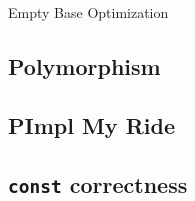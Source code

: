 \begin{frame}{Empty Base Optimization}{}
  \begin{example}
  \end{example}
\end{frame}


\subsection{Polymorphism}

%


\subsection{PImpl My Ride}



\subsection{\texttt{const} correctness}

%
%
%



